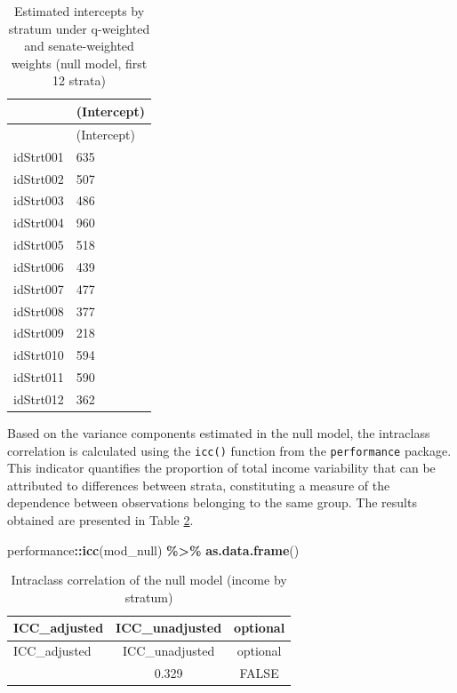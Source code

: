 \documentclass[
  english,
  12pt,
]{book}
\newenvironment{Shaded}{\begin{snugshade}}{\end{snugshade}}
\newcommand{\FunctionTok}[1]{\textcolor[rgb]{0.13,0.29,0.53}{\textbf{#1}}}
\newcommand{\NormalTok}[1]{#1}
\newcommand{\SpecialCharTok}[1]{\textcolor[rgb]{0.81,0.36,0.00}{\textbf{#1}}}
\begin{document}
\begin{longtable}[]{@{}ll@{}}
\caption{\label{tab:tab-interceptos-nulos}Estimated intercepts by stratum under q-weighted and senate-weighted weights (null model, first 12 strata)}\tabularnewline
\toprule\noalign{}
& (Intercept) \\
\midrule\noalign{}
\endfirsthead
\toprule\noalign{}
& (Intercept) \\
\midrule\noalign{}
\endhead
\bottomrule\noalign{}
\endlastfoot
idStrt001 & 635 \\
idStrt002 & 507 \\
idStrt003 & 486 \\
idStrt004 & 960 \\
idStrt005 & 518 \\
idStrt006 & 439 \\
idStrt007 & 477 \\
idStrt008 & 377 \\
idStrt009 & 218 \\
idStrt010 & 594 \\
idStrt011 & 590 \\
idStrt012 & 362 \\
\end{longtable}

Based on the variance components estimated in the null model, the intraclass correlation is calculated using the \texttt{icc()} function from the \texttt{performance} \citep{performance2026} package. This indicator quantifies the proportion of total income variability that can be attributed to differences between strata, constituting a measure of the dependence between observations belonging to the same group. The results obtained are presented in Table \ref{tab:tab-icc-nulo}.

\begin{Shaded}
\begin{Highlighting}[]
\NormalTok{performance}\SpecialCharTok{::}\FunctionTok{icc}\NormalTok{(mod\_null) }\SpecialCharTok{\%\textgreater{}\%}
  \FunctionTok{as.data.frame}\NormalTok{()}
\end{Highlighting}
\end{Shaded}

\begin{longtable}[]{@{}lcc@{}}
\caption{\label{tab:tab-icc-nulo}Intraclass correlation of the null model (income by stratum)}\tabularnewline
\toprule\noalign{}
ICC\_adjusted & ICC\_unadjusted & optional \\
\midrule\noalign{}
\endfirsthead
\toprule\noalign{}
ICC\_adjusted & ICC\_unadjusted & optional \\
\midrule\noalign{}
\endhead
\bottomrule\noalign{}
\endlastfoot
0.329 & 0.329 & FALSE \\
\end{longtable}
\end{document}
